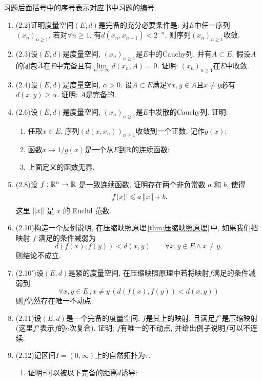 	习题后面括号中的序号表示对应书中习题的编号.

	\begin{enumerate}[label=\textbf{\arabic*.}, ref=\arabic*]
	\item (2.2)证明度量空间$ (E,d) $是完备的充分必要条件是: 对$ E $中任一序列$ (x_n)_{n\geqslant 1} $, 若对$ \forall n\geqslant 1 $, 有$ d(x_n,x_{n+1})<2^{-n} $, 则序列$ (x_n)_{n\geqslant 1} $收敛. 
	\item (2.3)设$ (E,d) $是度量空间, $ (x_n)_{n\geqslant 1} $是$ E $中的Cauchy列, 并有$ A\subset E $. 假设$ A $的闭包$ \baro{A} $在$ E $中完备且有$ \lim\limits_{n\to\infty}d(x_n,A)=0 $. 证明: $ (x_n)_{n\geqslant 1} $在$ E $中收敛. 
	\item (2.4)设$ (E,d) $是度量空间, $ \alpha>0 $. 设$ A\subset E $满足$ \forall x,y\in A $且$ x\ne y $必有$ d(x,y)\geqslant\alpha $. 证明: $ A $是完备的. 
	\item (2.6)设$ (E,d) $是度量空间, $ (x_n)_{n\geqslant 1} $是$ E $中发散的Cauchy列. 证明:
		\begin{enumerate}[(1)]
		\item 任取$ x\in E $, 序列$ (d(x,x_n))_{n\geqslant 1} $收敛到一个正数, 记作$ g(x) $;
		\item 函数$ x\mapsto1/g(x) $是一个从$ E $到$ \R $的连续函数;
		\item 上面定义的函数无界.
		\end{enumerate}
	\item (2.8)设 $ f: \R^{n}\to\R $ 是一致连续函数, 证明存在两个非负常数 $ a $ 和 $ b $, 使得
		\[
			\abs{f(x)}\leqslant a\norm{x}+b.
		\]
		这里 $ \norm{x} $ 是 $ x $ 的 Euclid 范数. 
	\item (2.10)构造一个反例说明, 在压缩映照原理\,\ref{thm:压缩映照原理}\,中, 如果我们把映射 $ f $ 满足的条件减弱为
		\[
			d(f(x), f(y))<d(x, y)\qquad \forall x, y\in E\wedge x\neq y,
		\]
		则结论不成立. 
	\item (2.10$ ' $)设$ (E,d) $是紧的度量空间, 在压缩映照原理中若将映射$ f $满足的条件减弱到
		\[
		\forall x,y\in E\,,x\ne y\,(d(f(x),f(y))<d(x,y))
		\]
		则$ f $仍然存在唯一不动点. 
	\item (2.11)设$ (E,d) $是一个完备的度量空间, $ f $是其上的映射, 且满足$ f^n $是压缩映射(这里$ f^n $表示$ f $的$ n $次复合). 证明: $ f $有唯一的不动点, 并给出例子说明$ f $可以不连续. 
	\item (2.12)记区间$ I=(0,\infty) $上的自然拓扑为$ \tau $.
	\begin{enumerate}[(1)]
		\item 证明$ \tau $可以被以下完备的距离$ d $诱导:

\end{enumerate}
\end{enumerate}
